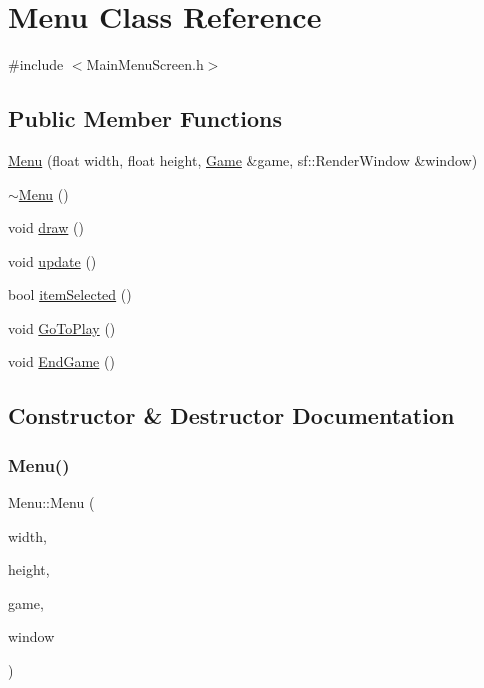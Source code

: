 \hypertarget{class_menu}{}\section{Menu Class Reference}
\label{class_menu}


{\ttfamily \#include $<$Main\+Menu\+Screen.\+h$>$}

\subsection*{Public Member Functions}
\begin{DoxyCompactItemize}
\item 
\mbox{\hyperlink{class_menu_a87a14f16b29b9c4b47081e221d35cbdc}{Menu}} (float width, float height, \mbox{\hyperlink{class_game}{Game}} \&game, sf\+::\+Render\+Window \&window)
\item 
\mbox{\hyperlink{class_menu_a831387f51358cfb88cd018e1777bc980}{$\sim$\+Menu}} ()
\item 
void \mbox{\hyperlink{class_menu_a2cd7ab9901a8f42a3ae977d0774398a6}{draw}} ()
\item 
void \mbox{\hyperlink{class_menu_a8446e8a1e56e9cf1db93790067510a61}{update}} ()
\item 
bool \mbox{\hyperlink{class_menu_ac5eeddcd824866f1fd4b3ed6e8146724}{item\+Selected}} ()
\item 
void \mbox{\hyperlink{class_menu_a9a1d32a0de02d53920ba66892903a835}{Go\+To\+Play}} ()
\item 
void \mbox{\hyperlink{class_menu_a2e8171f80079f9ddba6569934d8082fb}{End\+Game}} ()
\end{DoxyCompactItemize}


\subsection{Constructor \& Destructor Documentation}
\mbox{\label{class_menu_a87a14f16b29b9c4b47081e221d35cbdc}} 
\subsubsection{\texorpdfstring{Menu()}{Menu()}}
{\footnotesize\ttfamily Menu\+::\+Menu (\begin{DoxyParamCaption}\item[{float}]{width,  }\item[{float}]{height,  }\item[{\mbox{\hyperlink{class_game}{Game}} \&}]{game,  }\item[{sf\+::\+Render\+Window \&}]{window }\end{DoxyParamCaption})}

